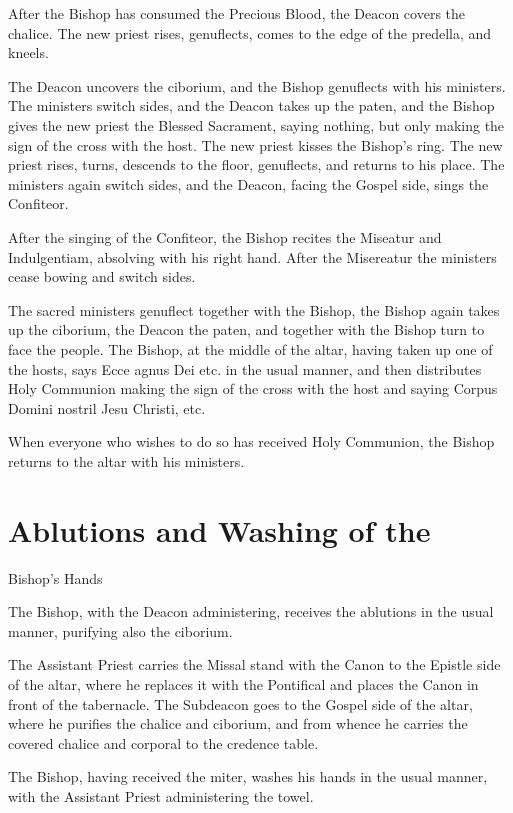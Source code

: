 \documentclass{report}
\begin{document}
{	After the Bishop has consumed the Precious Blood, the Deacon covers the
	chalice. The new priest rises, genuflects, comes to the edge of the
	predella, and kneels.

	The Deacon uncovers the ciborium, and the Bishop genuflects with his
	ministers. The ministers switch sides, and the Deacon takes up the paten,
	and the Bishop gives the new priest the Blessed Sacrament, saying nothing,
	but only making the sign of the cross with the host. The new priest kisses
	the Bishop’s ring. The new priest rises, turns, descends to the floor,
	genuflects, and returns to his place. The ministers again switch sides, and
	the Deacon, facing the Gospel side, sings the Confiteor.

	After the singing of the Confiteor, the Bishop recites the Miseatur and
	Indulgentiam, absolving with his right hand. After the Misereatur the
	ministers cease bowing and switch sides.

	The sacred ministers genuflect together with the Bishop, the Bishop again
	takes up the ciborium, the Deacon the paten, and together with the Bishop
	turn to face the people. The Bishop, at the middle of the altar, having
	taken up one of the hosts, says Ecce agnus Dei etc. in the usual manner,
	and then distributes Holy Communion making the sign of the cross with the
	host and saying Corpus Domini nostril Jesu Christi, etc.

	When everyone who wishes to do so has received Holy Communion, the Bishop
	returns to the altar with his ministers.

	\section{Ablutions and Washing of the}

	Bishop’s Hands

	The Bishop, with the Deacon administering, receives the ablutions in the
	usual manner, purifying also the ciborium.

	The Assistant Priest carries the Missal stand with the Canon to the Epistle
	side of the altar, where he replaces it with the Pontifical and places the
	Canon in front of the tabernacle. The Subdeacon goes to the Gospel side of
	the altar, where he purifies the chalice and ciborium, and from whence he
	carries the covered chalice and corporal to the credence table.

	The Bishop, having received the miter, washes his hands in the usual
	manner, with the Assistant Priest administering the towel.

}
\end{document}

